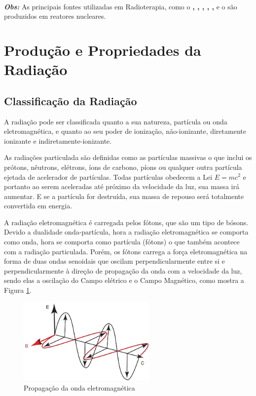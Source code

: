 \documentclass[11pt,a4paper]{article}
\begin{document}
                \

                \noindent \textbf{\textit{\textcolor{CarnationPink}{Obs:}}} As principais fontes utilizadas em Radioterapia, como o \textbf{, , , , , } e o \textbf{} são produzidos em reatores nucleares.  
    
    \section{Produção e Propriedades da Radiação}
        
        \subsection{Classificação da Radiação}

            A radiação pode ser classificada quanto a sua natureza, partícula ou onda eletromagnética, e quanto ao seu poder de ionização, não-ionizante, diretamente ionizante e indiretamente-ionizante.

            As radiações particulada são definidas como as partículas massivas o que inclui os prótons, nêutrons, elétrons, íons de carbono, píons ou qualquer outra partícula ejetada de acelerador de partículas. Todas partículas obedecem a Lei $E = mc^2$ e portanto ao serem aceleradas até próximo da velocidade da luz, sua massa irá aumentar. E se a partícula for destruída, sua massa de repouso será totalmente convertida em energia.

            A radiação eletromagnética é carregada pelos fótons, que são um tipo de bósons. Devido a dualidade onda-partícula, hora a radiação eletromagnética se comporta como onda, hora se comporta como partícula (fótons) o que também acontece com a radiação particulada. Porém, os fótons carrega a força eletromagnética na forma de duas ondas senoidais que oscilam perpendicularmente entre si e perpendicularmente à direção de propagação da onda com a velocidade da luz, sendo elas a oscilação do Campo elétrico e o Campo Magnético, como mostra a Figura \ref{fig:ondaEletromagnetica}.

                    \begin{figure}[h]
                        \centering
                        \includegraphics[width=0.6\textwidth]{Imagens/ondaEletromagnetica.jpg}
                        \caption{Propagação da onda eletromagnética}
                        \label{fig:ondaEletromagnetica}
                    \end{figure}
            
\end{document}
